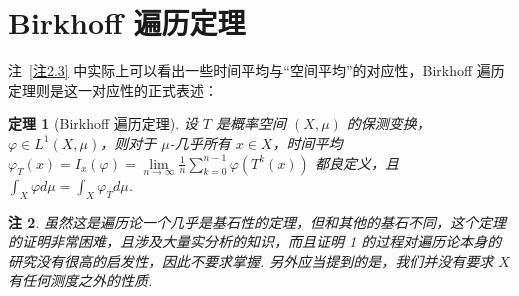 \documentclass[11pt, a4paper, oneside]{ctexart}
\newtheorem{theorem}{定理}[section]
\newtheorem{remark}[theorem]{注}
\begin{document}
    \section{Birkhoff 遍历定理}
    注~\ref{注2.3} 中实际上可以看出一些时间平均与“空间平均”的对应性，Birkhoff 遍历定理则是这一对应性的正式表述：
    \begin{theorem}[Birkhoff 遍历定理]\label{定理4.1}
        设 $T$ 是概率空间 $(X,\mu)$ 的保测变换，$\varphi\in L^1(X,\mu)$，则对于 $\mu$-几乎所有 $x\in X$，时间平均 $\varphi_T(x)=I_x(\varphi)=\lim\limits_{n\to\infty}\frac{1}{n}\sum\limits_{k=0}^{n-1}\varphi(T^k(x))$ 都良定义，且 $\int_{X} \varphi d\mu=\int_{X} \varphi_T d\mu$.
    \end{theorem}
    \begin{remark}
        虽然这是遍历论一个几乎是基石性的定理，但和其他的基石不同，这个定理的证明非常困难，且涉及大量实分析的知识，而且证明 1 的过程对遍历论本身的研究没有很高的启发性，因此不要求掌握. 另外应当提到的是，我们并没有要求 $X$ 有任何测度之外的性质.
    \end{remark}
\end{document}
